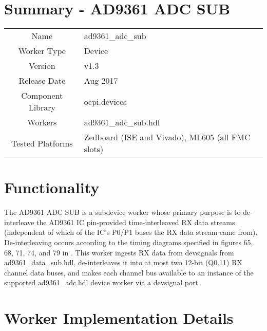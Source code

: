 \documentclass{article}
\author{} %
\date{Version \docVersion} %
\title{\docTitle}
\def\docVersion{1.3}
\def\comp{ad9361\_adc\_sub}
\def\Comp{AD9361 ADC SUB}
\begin{document}
\section*{Summary - \Comp}
\begin{tabular}{|c|M{13.5cm}|}
	\hline
	                  &                  \\
	\hline
	Name              & \comp            \\
	\hline
	Worker Type       & Device           \\
	\hline
	Version           & v\docVersion     \\
	\hline
	Release Date      & Aug 2017         \\
	\hline
	Component Library & ocpi.devices     \\
	\hline
	Workers           & \comp.hdl        \\
	\hline
	Tested Platforms  & Zedboard (ISE and Vivado), ML605 (all FMC slots) \\
	\hline
\end{tabular}

\section*{Functionality}
	The \Comp{} is a subdevice worker whose primary purpose is to de-interleave the AD9361 IC pin-provided time-interleaved RX data streams (independent of which of the IC's P0/P1 buses the RX data stream came from). De-interleaving occurs according to the timing diagrams specified in figures 65, 68, 71, 74, and 79 in \cite{adi_ug570}. This worker ingests RX data from devsignals from ad9361\_data\_sub.hdl\cite{data_sub_comp_datasheet}, de-interleaves it into at most two 12-bit (Q0.11) RX channel data buses, and makes each channel bus available to an instance of the supported ad9361\_adc.hdl device worker via a devsignal port.

\section*{Worker Implementation Details}
\end{document}
